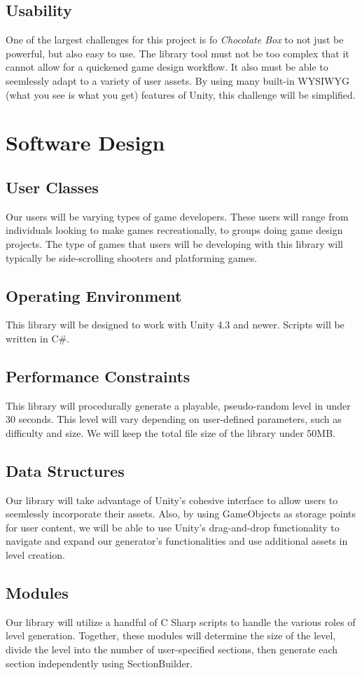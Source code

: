 \documentclass[pdftex,12pt,letter]{article}
\begin{document}
\begin{itemize}
\begin{itemize}
\begin{itemize}
\subsection{Usability}
One of the largest challenges for this project is fo \textit{Chocolate Box} to not just be powerful, but also easy to use. The library tool must not be too complex that it cannot allow for a quickened game design workflow. It also must be able to seemlessly adapt to a variety of user assets. By using many built-in WYSIWYG (what you see is what you get) features of Unity, this challenge will be simplified. 


\section{Software Design}
\subsection{User Classes}
Our users will be varying types of game developers. These users will range from individuals looking to make games recreationally, to groups doing game design projects. The type of games that users will be developing with this library will typically be side-scrolling shooters and platforming games.
\subsection{Operating Environment}
This library will be designed to work with Unity 4.3 and newer. Scripts will be written in C\#.
\subsection{Performance Constraints}
This library will procedurally generate a playable, pseudo-random level in under 30 seconds. This level will vary depending on user-defined parameters, such as difficulty and size. We will keep the total file size of the library under 50MB.
\subsection{Data Structures}
Our library will take advantage of Unity's cohesive interface to allow users to seemlessly incorporate their assets.  Also, by using GameObjects as storage points for user content, we will be able to use Unity's drag-and-drop functionality to navigate and expand our generator's functionalities and use additional assets in level creation.
\subsection{Modules}
Our library will utilize a handful of C Sharp scripts to handle the various roles of level generation. Together, these modules will determine the size of the level, divide the level into the number of user-specified sections, then generate each section independently using SectionBuilder. 
\begin{itemize}


\end{itemize}
\end{itemize}
\end{itemize}
\end{itemize}
\end{document}
